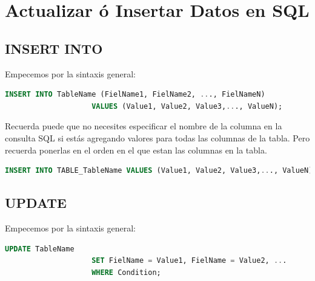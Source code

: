 \documentclass[12pt, fleqn]{report}                             %
\begin{document}
    \clearpage
    \chapter{Actualizar ó Insertar Datos en SQL}


        \clearpage
        \section{INSERT INTO}

            Empecemos por la sintaxis general:

            \begin{lstlisting}[language=SQL, gobble=16]
                INSERT INTO TableName (FielName1, FielName2, ..., FielNameN)  
                    VALUES (Value1, Value2, Value3,..., ValueN);
            \end{lstlisting}

            Recuerda puede que no necesites especificar el nombre de la columna
            en la consulta SQL si estás agregando valores para todas las columnas de la tabla.
            Pero recuerda ponerlas en el orden en el que estan las columnas en la tabla.

            \begin{lstlisting}[language=SQL, gobble=16]
                INSERT INTO TABLE_TableName VALUES (Value1, Value2, Value3,..., ValueN);
            \end{lstlisting}


        \clearpage
        \section{UPDATE}

            Empecemos por la sintaxis general:

            \begin{lstlisting}[language=SQL, gobble=16]
                UPDATE TableName
                    SET FielName = Value1, FielName = Value2, ...
                    WHERE Condition;
            \end{lstlisting}
\end{document}
